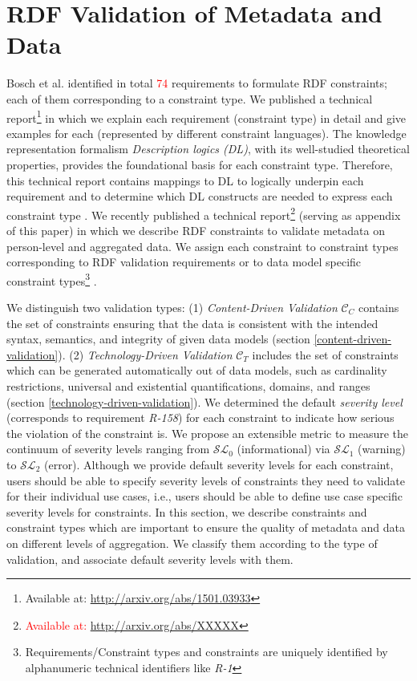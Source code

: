 \documentclass{llncs}
\begin{document}
\section{RDF Validation of Metadata and Data}
\label{rdf-validation}

Bosch et al. identified in total \textcolor{red}{74} requirements to formulate RDF constraints; each of them corresponding to a constraint type. 
We published a technical report\footnote{Available at: \url{http://arxiv.org/abs/1501.03933}} in which we explain each requirement (constraint type) in detail and give examples for each (represented by different constraint languages).
The knowledge representation formalism \emph{Description logics (DL)}, with its  well-studied theoretical properties, provides the foundational basis for each constraint type.
Therefore, this technical report contains mappings to DL to logically underpin each requirement and to determine which DL constructs are needed to express each constraint type \cite{BoschNolleAcarEckert2015}.
We recently published a technical report\footnote{\textcolor{red}{Available at: \url{http://arxiv.org/abs/XXXXX}}} (serving as appendix of this paper) in which we describe RDF constraints to validate metadata on person-level and aggregated data.
We assign each constraint to constraint types corresponding to RDF validation requirements or to data model specific constraint types\footnote{Requirements/Constraint types and constraints are uniquely identified by alphanumeric technical identifiers like \emph{R-1}}
\cite{BoschZapilkoWackerowEckert2015}.

We distinguish two validation types:
(1) \emph{Content-Driven Validation} $\mathcal{C}_{C}$ contains the set of constraints ensuring that the data is consistent with the intended syntax, semantics, and integrity of given data models (section \ref{content-driven-validation}).
(2) \emph{Technology-Driven Validation} $\mathcal{C}_{T}$ includes the set of constraints which can be generated automatically out of data models, such as cardinality restrictions, universal and existential quantifications, domains, and ranges (section \ref{technology-driven-validation}).
We determined the default \emph{severity level} (corresponds to requirement \emph{R-158}) for each constraint to indicate how serious the violation of the constraint is.
We propose an extensible metric to measure the continuum of severity levels ranging from $\mathcal{SL}_{0}$ (informational) via $\mathcal{SL}_{1}$ (warning) to $\mathcal{SL}_{2}$ (error). 
Although we provide default severity levels for each constraint, users should be able to specify severity levels of constraints they need to validate for their individual use cases, i.e., users should be able to define use case specific severity levels for constraints.
In this section, we describe constraints and constraint types which are important to ensure the quality of metadata and data on different levels of aggregation. 
We classify them according to the type of validation, and associate default severity levels with them. 
\end{document}

